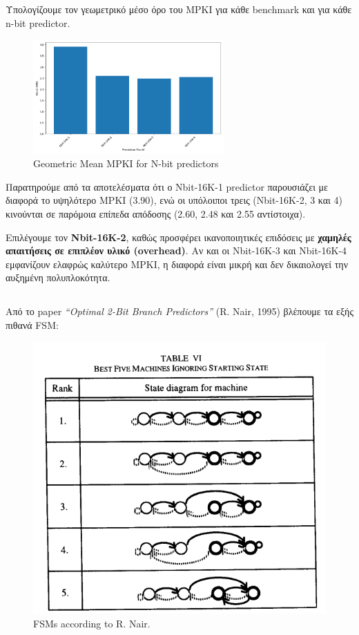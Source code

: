 \documentclass{article}
\begin{document}
Υπολογίζουμε τον γεωμετρικό μέσο όρο του MPKI για κάθε benchmark και για κάθε n-bit predictor. 

\begin{figure}[H]
    \centering
    \includegraphics[width=0.65\textwidth]{figures/5_3/geom_mean.png}
    \caption{Geometric Mean MPKI for N-bit predictors}
    \label{fig:mean_mpkis}
\end{figure}

Παρατηρούμε από τα αποτελέσματα ότι ο Nbit-16K-1 predictor παρουσιάζει με διαφορά το υψηλότερο MPKI (3.90), ενώ οι υπόλοιποι τρεις (Nbit-16K-2, 3 και 4) κινούνται σε παρόμοια επίπεδα απόδοσης (2.60, 2.48 και 2.55 αντίστοιχα).

Επιλέγουμε τον \textbf{Nbit-16K-2}, καθώς προσφέρει ικανοποιητικές επιδόσεις με \textbf{χαμηλές απαιτήσεις σε επιπλέον υλικό (overhead)}. Αν και οι Nbit-16K-3 και Nbit-16K-4 εμφανίζουν ελαφρώς καλύτερο MPKI, η διαφορά είναι μικρή και δεν δικαιολογεί την αυξημένη πολυπλοκότητα.

\subsection{}
 Από το paper \textit{“Optimal 2-Bit Branch Predictors”} (R. Nair, 1995) βλέπουμε τα εξής πιθανά FSM:

 \begin{figure}[h!]
     \centering
     \includegraphics[width=0.5\linewidth]{figures/FMS.png}
     \caption{FSMs according to R. Nair.}
     \label{fig:enter-label}
 \end{figure}
\end{document}
